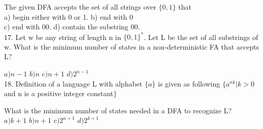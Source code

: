 \documentclass[9pt]{beamer}
\begin{document}
\begin{frame}
\hspace*{0.5cm} The given DFA accepts the set of all strings over $\{0, 1\}$ that\\

\vspace*{0.1cm}
\hspace{0.5cm} a) begin either with 0 or 1.    \hspace{1cm}  b) end with 0\\
\hspace{0.5cm} c) end with 00.                 \hspace{2cm}  d) contain the substring 00.\\

\vspace*{0.2cm}
17. Let w be any string of length n in $\{0, 1\}^{*}$. Let L be the set of all substrings of w. What is the minimum
number of states in a non-deterministic FA that accepts L?\\
\vspace*{0.1cm}

\hspace*{0.5cm} $a) n - 1$   \hspace*{0.5cm} $b) n$   \hspace*{0.5cm} $c) n + 1$     \hspace*{0.5cm} $d) 2^{n - 1}$ \\

\vspace*{0.2cm}
18. Definition of a language L with alphabet $\{a\}$ is given as following $\{a^{nk} | k > 0$ and n is a positive
integer constant$\}$ \\
\vspace*{0.1cm}

\hspace*{0.5cm} What is the minimum number of states needed in a DFA to recognize L?\\

\vspace*{0.1cm}
\hspace*{0.5cm} $a) k + 1$    \hspace*{0.5cm} $b) n + 1$     \hspace*{0.5cm} $c) 2^{n + 1}$    \hspace*{0.5cm} $d) 2^{k + 1}$\\

\end{frame}
\end{document}
